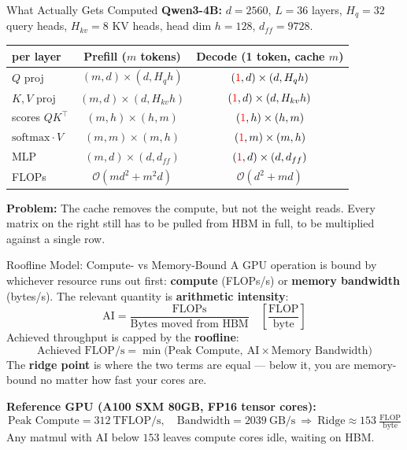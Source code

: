 \documentclass[aspectratio=169, 11pt]{beamer}
\begin{document}
\begin{frame}{What Actually Gets Computed}
\vspace{0.3em}
\textbf{Qwen3-4B:} $d = 2560$, $L = 36$ layers, $H_q = 32$ query heads, $H_{kv} = 8$ KV heads,
head dim $h = 128$, $d_{ff} = 9728$.

\vspace{0.3em}
\begin{table}
\centering
\footnotesize
\begin{tabular}{lcc}
\toprule
per layer & \textbf{Prefill} ($m$ tokens) & \textbf{Decode} (1 token, cache $m$) \\
\midrule
$Q$ proj            & $(m,d)\times(d,H_q h)$    & $({\color{red}1},d)\times(d,H_q h)$ \\
$K,V$ proj          & $(m,d)\times(d,H_{kv}h)$  & $({\color{red}1},d)\times(d,H_{kv}h)$ \\
scores $QK^\top$    & $(m,h)\times(h,m)$        & $({\color{red}1},h)\times(h,m)$ \\
$\mathrm{softmax}\cdot V$ & $(m,m)\times(m,h)$  & $({\color{red}1},m)\times(m,h)$ \\
MLP                 & $(m,d)\times(d,d_{ff})$   & $({\color{red}1},d)\times(d,d_{ff})$ \\
\midrule
FLOPs               & $\mathcal{O}(m d^2 + m^2 d)$ & $\mathcal{O}(d^2 + m d)$ \\
\bottomrule
\end{tabular}
\end{table}
\textbf{Problem:} The cache removes the compute, but not the weight reads. Every matrix on the right
still has to be pulled from HBM in full, to be multiplied against a single row.
\end{frame}



\begin{frame}{Roofline Model: Compute- vs Memory-Bound}
A GPU operation is bound by whichever resource runs out first: \textbf{compute} (FLOPs/s)
or \textbf{memory bandwidth} (bytes/s). The relevant quantity is \textbf{arithmetic intensity}:
\[
  \text{AI} = \frac{\text{FLOPs}}{\text{Bytes moved from HBM}} \quad \left[\frac{\text{FLOP}}{\text{byte}}\right]
\]
Achieved throughput is capped by the \textbf{roofline}:
\[
  \text{Achieved FLOP/s} = \min\big(\text{Peak Compute},\ \text{AI} \times \text{Memory Bandwidth}\big)
\]
The \textbf{ridge point} is where the two terms are equal --- below it, you are memory-bound
no matter how fast your cores are.

\vspace{0.5em}
\textbf{Reference GPU (A100 SXM 80GB, FP16 tensor cores):}
\[
  \text{Peak Compute} = 312~\text{TFLOP/s}, \quad
  \text{Bandwidth} = 2039~\text{GB/s}
  \ \Rightarrow\ \text{Ridge} \approx 153~\tfrac{\text{FLOP}}{\text{byte}}
\]
Any matmul with AI below $153$ leaves compute cores idle, waiting on HBM.
\end{frame}
\end{document}

